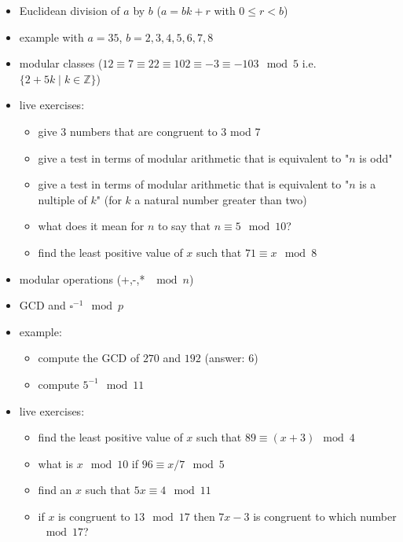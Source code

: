 \documentclass[a4paper,12pt]{article}
\providecommand{\tightlist}{\setlength{\itemsep}{0pt}\setlength{\parskip}{0pt}}
\newcommand{\Z}{\mathbb{Z}}
\begin{document}
	\begin{itemize}
	\tightlist
	\item
	Euclidean division of \(a\) by \(b\) (\(a=bk+r\) with
	\(0 \leq r < b\))
	\item
	example with \(a=35\), \(b=2,3,4,5,6,7,8\)
	\item
	modular classes
	(\(12 \equiv 7 \equiv 22 \equiv 102 \equiv -3 \equiv -103 \mod 5\)
	i.e. \(\{2+5k \mid k \in \Z \}\))
	\item
	live exercises:
	
	\begin{itemize}
		\tightlist
		\item
		give 3 numbers that are congruent to 3 mod 7
		\item
		give a test in terms of modular arithmetic that is equivalent to
		"\(n\) is odd"
		\item
		give a test in terms of modular arithmetic that is equivalent to
		"\(n\) is a nultiple of \(k\)" (for \(k\) a natural number greater
		than two)
		\item
		what does it mean for \(n\) to say that \(n \equiv 5 \mod 10\)?
		\item
		find the least positive value of \(x\) such that
		\(71 \equiv x \mod 8\)
	\end{itemize}
	\item
	modular operations (+,-,* \(\mod n\))
	\item
	GCD and \(\square^{-1} \mod p\)
	\item
	example:
	
	\begin{itemize}
		\tightlist
		\item
		compute the GCD of \(270\) and \(192\) (answer: \(6\))
		\item
		compute \(5^{-1} \mod 11\)
	\end{itemize}
	\item
	live exercises:
	
	\begin{itemize}
		\tightlist
		\item
		find the least positive value of \(x\) such that
		\(89 \equiv (x + 3) \mod 4\)
		\item
		what is \(x \mod 10\) if \(96 \equiv x / 7 \mod 5\)
		\item
		find an \(x\) such that \(5x \equiv 4 \mod 11\)
		\item
		if \(x\) is congruent to \(13 \mod 17\) then \(7x - 3\) is congruent
		to which number \(\mod 17\)?
	\end{itemize}
	\end{itemize}
	
\end{document}
